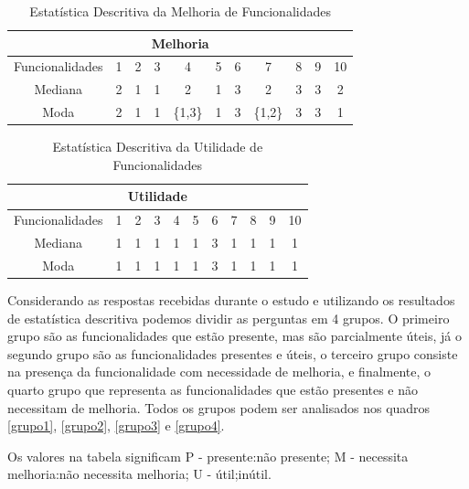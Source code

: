 \begin{table}[h]
	\centering
	\caption{Estatística Descritiva da Melhoria de Funcionalidades}
	\label{estatistica_melhoria}
	\begin{tabular}{|c|c|c|c|c|c|c|c|c|c|c|}
			\hline
			\multicolumn{11}{|c|}{Melhoria}\\
			\hline
			Funcionalidades & 1 & 2 & 3 & 4 & 5 & 6 & 7 & 8 & 9 & 10 \\
			\hline
			Mediana & 2 & 1 & 1 & 2 & 1 & 3 & 2 & 3 & 3 & 2 \\
			\hline
			Moda & 2 & 1 & 1 & \{1,3\} & 1 & 3 & \{1,2\} & 3 & 3 & 1 \\
			\hline
			
			
	\end{tabular}
\end{table}

\begin{table}[h]
	\centering
	\caption{Estatística Descritiva da Utilidade de Funcionalidades}
	\label{estatistica_utilidade}
	\begin{tabular}{|c|c|c|c|c|c|c|c|c|c|c|}
			\hline
			\multicolumn{11}{|c|}{Utilidade}\\
			\hline
			Funcionalidades & 1 & 2 & 3 & 4 & 5 & 6 & 7 & 8 & 9 & 10 \\
			\hline
			Mediana & 1 & 1 & 1 & 1 & 1 & 3 & 1 & 1 & 1 & 1 \\
			\hline
			Moda & 1 & 1 & 1 &1 & 1 & 3 & 1 & 1 & 1 & 1 \\
			\hline
			
			
	\end{tabular}
\end{table}

Considerando as respostas recebidas durante o estudo e utilizando os resultados de estatística descritiva podemos dividir as perguntas em 4 grupos. O primeiro grupo são as funcionalidades que estão presente, mas são parcialmente úteis, já o segundo grupo são as funcionalidades presentes e úteis, o terceiro grupo consiste na presença da funcionalidade com necessidade de melhoria, e finalmente, o quarto grupo que representa as funcionalidades que estão presentes e não necessitam de melhoria. Todos os grupos podem ser analisados nos quadros \ref{grupo1}, \ref{grupo2}, \ref{grupo3} e \ref{grupo4}.

Os valores na tabela significam P - presente:não presente; M - necessita melhoria:não necessita melhoria; U - útil;inútil. 


